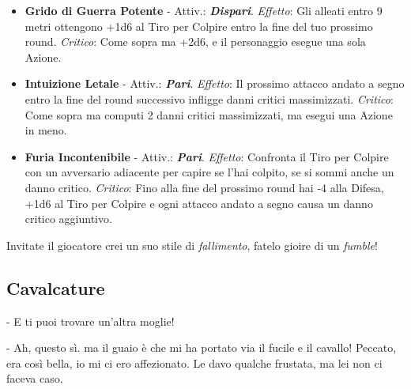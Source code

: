 \begin{multicols}{2}
\begin{itemize}[leftmargin=*]
\begin{itemize}[leftmargin=*]
		\item \textbf{Grido di Guerra Potente} - Attiv.: \textbf{\emph{Dispari}}. \emph{Effetto}: Gli alleati entro 9 metri ottengono +1d6 al Tiro per Colpire entro la fine del tuo prossimo round. \emph{Critico}: Come sopra ma +2d6, e il personaggio esegue una sola Azione.
		
		\item \textbf{Intuizione Letale} - Attiv.: \textbf{\emph{Pari}}. \emph{Effetto}: Il prossimo attacco andato a segno entro la fine del round successivo infligge danni critici massimizzati. \emph{Critico}: Come sopra ma computi 2 danni critici massimizzati, ma esegui una Azione in meno.
		
		\item \textbf{Furia Incontenibile} - Attiv.: \textbf{\emph{Pari}}. \emph{Effetto}: Confronta il Tiro per Colpire con un avversario adiacente per capire se l'hai colpito, se si sommi anche un danno critico. \emph{Critico}: Fino alla fine del prossimo round hai -4 alla Difesa, +1d6 al Tiro per Colpire e ogni attacco andato a segno causa un danno critico aggiuntivo.
	\end{itemize}
	
\end{itemize}

%
%


\begin{changemargin}{0.3cm}{0.3cm}\begin{narratore}
		Invitate il giocatore crei un suo stile di \emph{fallimento}, fatelo gioire di un \emph{fumble}!
\end{narratore}\end{changemargin}

\subsection{Cavalcature}\label{cavalcature}\hypertarget{cavalcare}{}\label{cavalcare}

\begin{changemargin}{0.3cm}{0.3cm}\begin{enfasi}{
- E ti puoi trovare un'altra moglie!

- Ah, questo sì. ma il guaio è che mi ha portato via il fucile e il cavallo! Peccato, era così bella, io mi ci ero affezionato. Le davo qualche frustata, ma lei non ci faceva caso.

}
\end{enfasi}
\end{changemargin}
\end{multicols}
